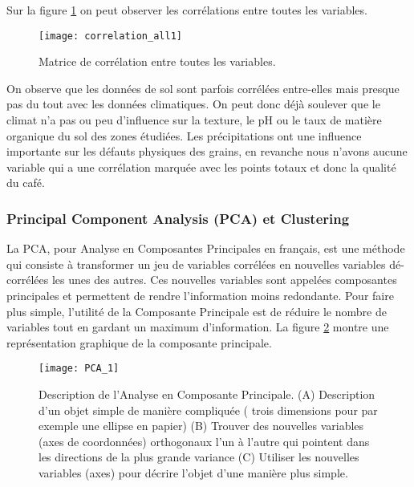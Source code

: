 \noindent Sur la figure \ref{correlation_all1} on peut observer les corrélations entre toutes les variables. 


\begin{figure}[H]
	\texttt{[image: correlation\_all1]}
	\caption{\label{correlation_all1} Matrice de corrélation entre toutes les variables.}
\end{figure}


\noindent On observe que les données de sol sont parfois corrélées entre-elles mais presque pas du tout avec les données climatiques. On peut donc déjà soulever que le climat n'a pas ou peu d'influence sur la texture, le pH ou le taux de matière organique du sol des zones étudiées. Les précipitations ont une influence importante sur les défauts physiques des grains, en revanche nous n'avons aucune variable qui a une corrélation marquée avec les points totaux et donc la qualité du café.   












\newpage
\subsubsection{Principal Component Analysis (PCA) et Clustering}\label{PCAss}
La PCA, pour Analyse en Composantes Principales en français, est une méthode qui consiste à transformer un jeu de variables corrélées en nouvelles variables dé-corrélées les unes des autres. Ces nouvelles variables sont appelées composantes principales et permettent de rendre l'information moins redondante. Pour faire plus simple, l'utilité de la Composante Principale est de réduire le nombre de variables tout en gardant un maximum d'information. La figure \ref{PCAdefinition} montre une représentation graphique de la composante principale. 


\begin{figure}[H]
	\texttt{[image: PCA\_1]}
	\caption{\label{PCAdefinition} Description de l'Analyse en Composante Principale. (A) Description d'un objet simple de manière compliquée ( trois dimensions pour par exemple une ellipse en papier) (B) Trouver des nouvelles variables (axes de coordonnées) orthogonaux l'un à l'autre qui pointent dans les directions de la plus grande variance (C) Utiliser les nouvelles variables (axes) pour décrire l'objet d'une manière plus simple. }
\end{figure}

